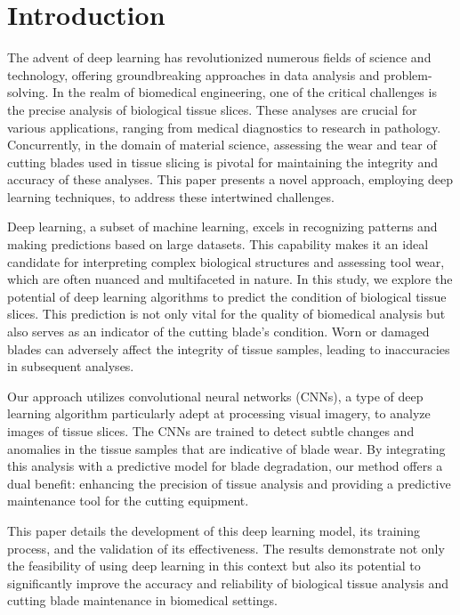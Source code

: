 \section{Introduction}
\label{sec:introduction}

The advent of deep learning has revolutionized numerous fields of science and technology, offering groundbreaking approaches in data analysis and problem-solving. In the realm of biomedical engineering, one of the critical challenges is the precise analysis of biological tissue slices. These analyses are crucial for various applications, ranging from medical diagnostics to research in pathology. Concurrently, in the domain of material science, assessing the wear and tear of cutting blades used in tissue slicing is pivotal for maintaining the integrity and accuracy of these analyses. This paper presents a novel approach, employing deep learning techniques, to address these intertwined challenges.

Deep learning, a subset of machine learning, excels in recognizing patterns and making predictions based on large datasets. This capability makes it an ideal candidate for interpreting complex biological structures and assessing tool wear, which are often nuanced and multifaceted in nature. In this study, we explore the potential of deep learning algorithms to predict the condition of biological tissue slices. This prediction is not only vital for the quality of biomedical analysis but also serves as an indicator of the cutting blade's condition. Worn or damaged blades can adversely affect the integrity of tissue samples, leading to inaccuracies in subsequent analyses.

Our approach utilizes convolutional neural networks (CNNs), a type of deep learning algorithm particularly adept at processing visual imagery, to analyze images of tissue slices. The CNNs are trained to detect subtle changes and anomalies in the tissue samples that are indicative of blade wear. By integrating this analysis with a predictive model for blade degradation, our method offers a dual benefit: enhancing the precision of tissue analysis and providing a predictive maintenance tool for the cutting equipment.

This paper details the development of this deep learning model, its training process, and the validation of its effectiveness. The results demonstrate not only the feasibility of using deep learning in this context but also its potential to significantly improve the accuracy and reliability of biological tissue analysis and cutting blade maintenance in biomedical settings.









\FloatBarrier %




